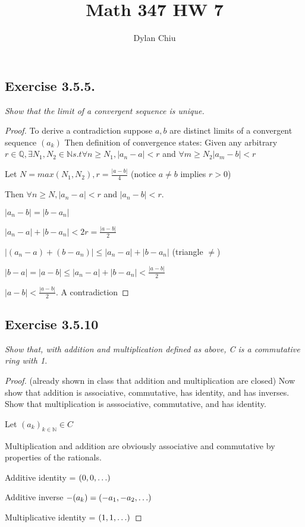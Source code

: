 \documentclass[12pt, a4paper]{article}
\title{Math 347 HW 7}
\author{Dylan Chiu}
\begin{document}
    \maketitle
    \subsection*{Exercise 3.5.5.}
        \textit{Show that the limit of a convergent sequence is unique.}
        \begin{proof}
            To derive a contradiction suppose $a,b$ are distinct limits of a convergent sequence $(a_k)$
            Then definition of convergence states: 
            Given any arbitrary $r \in \mathbb{Q}, \exists N_1, N_2 \in \mathbb{N} s.t \forall n \ge N_1, |a_n - a| < r$ and $\forall m \ge N_2 |a_m - b| < r$

            Let $N=max(N_1, N_2), r = \frac{|a-b|}{4}$ (notice $a\not = b$ implies $r > 0$)

            Then $\forall n \ge N, |a_n - a| < r$ and $|a_n - b| < r.$

            $|a_n-b| = |b - a_n|$

            $|a_n - a| + |b - a_n| < 2r = \frac{|a-b|}{2}$
            
            $|(a_n-a)+(b-a_n)| \le |a_n - a| + |b - a_n|$ (triangle $\not =$)

            $|b-a| = |a-b| \le |a_n - a| + |b - a_n| < \frac{|a-b|}{2}$

            $|a-b| < \frac{|a-b|}{2}$. A contradiction 
            
        \end{proof}
    \subsection*{Exercise 3.5.10}
        \textit{Show that, with addition and multiplication defined as above, C is a commutative ring with 1.}
        \begin{proof}
            (already shown in class that addition and multiplication are closed)
            Now show that addition is associative, commutative, has identity, and has inverses.
            Show that multiplication is asssociative, commutative, and has identity. 

            Let $(a_k)_{k\in \mathbb{N}} \in C$

            Multiplication and addition are obviously associative and commutative by properties of the rationals. 

            Additive identity = $(0,0,\mathellipsis)$

            Additive inverse $-(a_k) = (-a_1, -a_2, \mathellipsis)$

            Multiplicative identity = $(1,1,\mathellipsis)$
        \end{proof}
        \pagebreak
\end{document}
